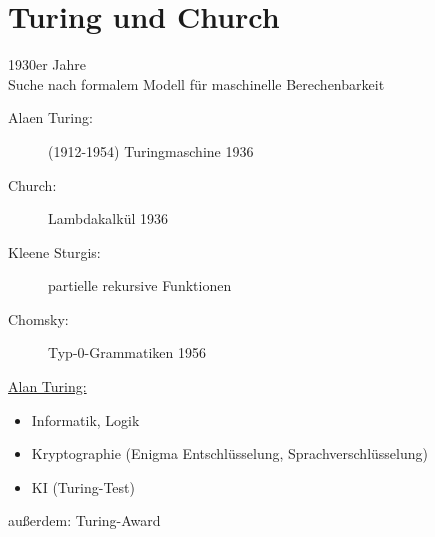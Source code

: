 \section{Turing und Church}
1930er Jahre\\
Suche nach formalem Modell für maschinelle Berechenbarkeit
\begin{description}
	\item[Alaen Turing:] (1912-1954) Turingmaschine 1936
	\item[Church:] Lambdakalkül 1936
	\item[Kleene Sturgis:] partielle rekursive Funktionen
	\item[Chomsky:] Typ-0-Grammatiken 1956
\end{description}
\underline{Alan Turing:}\begin{minipage}[t]{.8\textwidth}
\begin{itemize}[parsep=0pt]
	\item Informatik, Logik
	\item Kryptographie (Enigma Entschlüsselung, Sprachverschlüsselung)
	\item KI (Turing-Test)
\end{itemize}\end{minipage}

außerdem: Turing-Award

